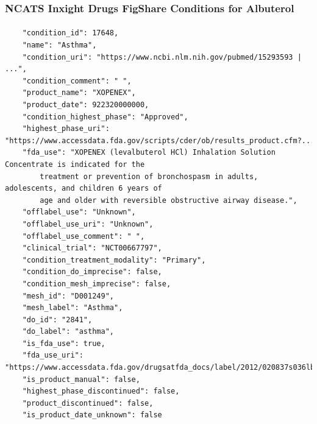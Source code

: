 \documentclass[aspectratio=169,xcolor=dvipsnames]{beamer}
\begin{document}
\begin{frame}[fragile,t]
  \frametitle{NCATS Inxight Drugs FigShare Conditions for Albuterol}
  \framesubtitle{}
  \tiny
\begin{verbatim}
    "condition_id": 17648,
    "name": "Asthma",
    "condition_uri": "https://www.ncbi.nlm.nih.gov/pubmed/15293593 | ...",
    "condition_comment": " ",
    "product_name": "XOPENEX",
    "product_date": 922320000000,
    "condition_highest_phase": "Approved",
    "highest_phase_uri": "https://www.accessdata.fda.gov/scripts/cder/ob/results_product.cfm?...",
    "fda_use": "XOPENEX (levalbuterol HCl) Inhalation Solution Concentrate is indicated for the
        treatment or prevention of bronchospasm in adults, adolescents, and children 6 years of
        age and older with reversible obstructive airway disease.",
    "offlabel_use": "Unknown",
    "offlabel_use_uri": "Unknown",
    "offlabel_use_comment": " ",
    "clinical_trial": "NCT00667797",
    "condition_treatment_modality": "Primary",
    "condition_do_imprecise": false,
    "condition_mesh_imprecise": false,
    "mesh_id": "D001249",
    "mesh_label": "Asthma",
    "do_id": "2841",
    "do_label": "asthma",
    "is_fda_use": true,
    "fda_use_uri": "https://www.accessdata.fda.gov/drugsatfda_docs/label/2012/020837s036lbl.pdf",
    "is_product_manual": false,
    "highest_phase_discontinued": false,
    "product_discontinued": false,
    "is_product_date_unknown": false
\end{verbatim}
\end{frame}
\end{document}
